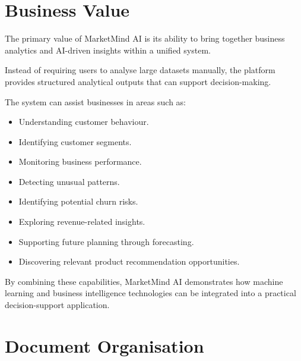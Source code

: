 \documentclass[12pt,a4paper]{report}
\begin{document}

\section{Business Value}

The primary value of MarketMind AI is its ability to bring together
business analytics and AI-driven insights within a unified system.

Instead of requiring users to analyse large datasets manually,
the platform provides structured analytical outputs that can support
decision-making.

The system can assist businesses in areas such as:

\begin{itemize}

    \item Understanding customer behaviour.

    \item Identifying customer segments.

    \item Monitoring business performance.

    \item Detecting unusual patterns.

    \item Identifying potential churn risks.

    \item Exploring revenue-related insights.

    \item Supporting future planning through forecasting.

    \item Discovering relevant product recommendation opportunities.

\end{itemize}

By combining these capabilities, MarketMind AI demonstrates how
machine learning and business intelligence technologies can be
integrated into a practical decision-support application.



\section{Document Organisation}
\end{document}
